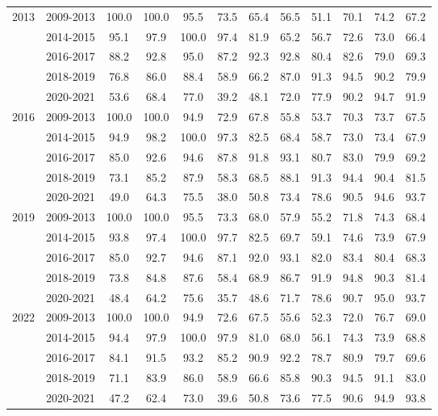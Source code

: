 \begin{table*}[ht]
\begin{tabular}{ll | cccccccccc}
    \multirow{5}{*}{\textsc{2013}} & 2009-2013 & 100.0 & 100.0 & 95.5 & 73.5 & 65.4 & 56.5 & 51.1 & 70.1 & 74.2 & 67.2 \\
    & 2014-2015 & 95.1 & 97.9 & 100.0 & 97.4 & 81.9 & 65.2 & 56.7 & 72.6 & 73.0 & 66.4 \\
    & 2016-2017 & 88.2 & 92.8 & 95.0 & 87.2 & 92.3 & 92.8 & 80.4 & 82.6 & 79.0 & 69.3 \\
    & 2018-2019 & 76.8 & 86.0 & 88.4 & 58.9 & 66.2 & 87.0 & 91.3 & 94.5 & 90.2 & 79.9 \\
    & 2020-2021 & 53.6 & 68.4 & 77.0 & 39.2 & 48.1 & 72.0 & 77.9 & 90.2 & 94.7 & 91.9 \\
    \hline
    \multirow{5}{*}{\textsc{2016}} & 2009-2013 & 100.0 & 100.0 & 94.9 & 72.9 & 67.8 & 55.8 & 53.7 & 70.3 & 73.7 & 67.5 \\
    & 2014-2015 & 94.9 & 98.2 & 100.0 & 97.3 & 82.5 & 68.4 & 58.7 & 73.0 & 73.4 & 67.9 \\
    & 2016-2017 & 85.0 & 92.6 & 94.6 & 87.8 & 91.8 & 93.1 & 80.7 & 83.0 & 79.9 & 69.2 \\
    & 2018-2019 & 73.1 & 85.2 & 87.9 & 58.3 & 68.5 & 88.1 & 91.3 & 94.4 & 90.4 & 81.5 \\
    & 2020-2021 & 49.0 & 64.3 & 75.5 & 38.0 & 50.8 & 73.4 & 78.6 & 90.5 & 94.6 & 93.7 \\
    \hline
    \multirow{5}{*}{\textsc{2019}} & 2009-2013 & 100.0 & 100.0 & 95.5 & 73.3 & 68.0 & 57.9 & 55.2 & 71.8 & 74.3 & 68.4 \\
    & 2014-2015 & 93.8 & 97.4 & 100.0 & 97.7 & 82.5 & 69.7 & 59.1 & 74.6 & 73.9 & 67.9 \\
    & 2016-2017 & 85.0 & 92.7 & 94.6 & 87.1 & 92.0 & 93.1 & 82.0 & 83.4 & 80.4 & 68.3 \\
    & 2018-2019 & 73.8 & 84.8 & 87.6 & 58.4 & 68.9 & 86.7 & 91.9 & 94.8 & 90.3 & 81.4 \\
    & 2020-2021 & 48.4 & 64.2 & 75.6 & 35.7 & 48.6 & 71.7 & 78.6 & 90.7 & 95.0 & 93.7 \\
    \hline
    \multirow{5}{*}{\textsc{2022}} & 2009-2013 & 100.0 & 100.0 & 94.9 & 72.6 & 67.5 & 55.6 & 52.3 & 72.0 & 76.7 & 69.0 \\
    & 2014-2015 & 94.4 & 97.9 & 100.0 & 97.9 & 81.0 & 68.0 & 56.1 & 74.3 & 73.9 & 68.8 \\
    & 2016-2017 & 84.1 & 91.5 & 93.2 & 85.2 & 90.9 & 92.2 & 78.7 & 80.9 & 79.7 & 69.6 \\
    & 2018-2019 & 71.1 & 83.9 & 86.0 & 58.9 & 66.6 & 85.8 & 90.3 & 94.5 & 91.1 & 83.0 \\
    & 2020-2021 & 47.2 & 62.4 & 73.0 & 39.6 & 50.8 & 73.6 & 77.5 & 90.6 & 94.9 & 93.8 \\


\end{tabular}
\end{table*}
